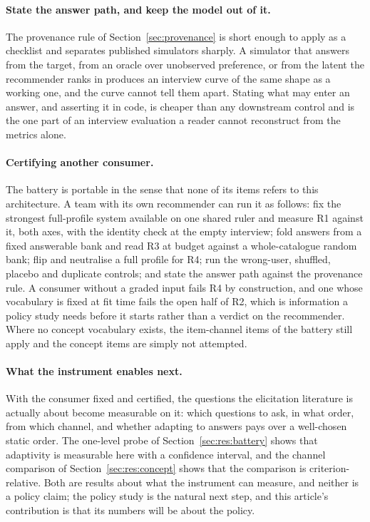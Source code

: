 \documentclass[manuscript,screen]{acmart}
\begin{document}
\paragraph{State the answer path, and keep the model out of it.} The provenance rule of Section~\ref{sec:provenance} is short enough to apply as a checklist and separates published simulators sharply. A simulator that answers from the target, from an oracle over unobserved preference, or from the latent the recommender ranks in produces an interview curve of the same shape as a working one, and the curve cannot tell them apart. Stating what may enter an answer, and asserting it in code, is cheaper than any downstream control and is the one part of an interview evaluation a reader cannot reconstruct from the metrics alone.

\paragraph{Certifying another consumer.} The battery is portable in the sense that none of its items refers to this architecture. A team with its own recommender can run it as follows: fix the strongest full-profile system available on one shared ruler and measure R1 against it, both axes, with the identity check at the empty interview; fold answers from a fixed answerable bank and read R3 at budget against a whole-catalogue random bank; flip and neutralise a full profile for R4; run the wrong-user, shuffled, placebo and duplicate controls; and state the answer path against the provenance rule. A consumer without a graded input fails R4 by construction, and one whose vocabulary is fixed at fit time fails the open half of R2, which is information a policy study needs before it starts rather than a verdict on the recommender. Where no concept vocabulary exists, the item-channel items of the battery still apply and the concept items are simply not attempted.

\paragraph{What the instrument enables next.} With the consumer fixed and certified, the questions the elicitation literature is actually about become measurable on it: which questions to ask, in what order, from which channel, and whether adapting to answers pays over a well-chosen static order. The one-level probe of Section~\ref{sec:res:battery} shows that adaptivity is measurable here with a confidence interval, and the channel comparison of Section~\ref{sec:res:concept} shows that the comparison is criterion-relative. Both are results about what the instrument can measure, and neither is a policy claim; the policy study is the natural next step, and this article's contribution is that its numbers will be about the policy.
\end{document}
